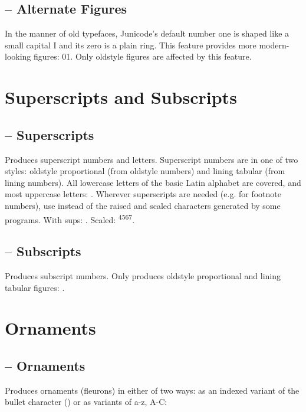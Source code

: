 \subsection{ -- Alternate Figures}
In the manner of old typefaces, Junicode's default number one is shaped like a small capital I and
its zero is a plain ring. This feature provides more modern-looking figures:
{01}. Only oldstyle figures
are affected by this feature.

\section{Superscripts and Subscripts}
\subsection{ -- Superscripts}
Produces superscript numbers and letters. Superscript numbers are in one of two styles: oldstyle proportional
(from oldstyle numbers) and lining tabular (from lining numbers). All lowercase
letters of the basic Latin alphabet are covered, and most uppercase letters: . Wherever
superscripts are needed (e.g. for footnote numbers), use  instead of the raised and scaled
characters generated by some programs. With sups: . Scaled: \textsuperscript{4567}.

\subsection{ -- Subscripts}
Produces subscript numbers. Only produces oldstyle proportional and lining tabular figures:
 .

\section{Ornaments}
\subsection{ -- Ornaments}
Produces ornaments (fleurons) in either of two ways: as an indexed variant of the bullet character () or as
variants of a-z, A-C:


